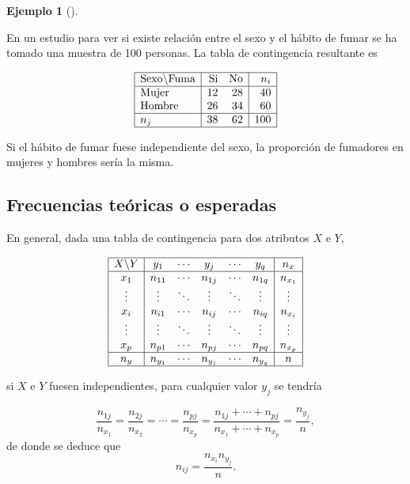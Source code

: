 \documentclass[
  a4paper,
]{scrreport}
\theoremstyle{plain}
\theoremstyle{definition}
\theoremstyle{definition}
\newtheorem{example}{Ejemplo}[chapter]
\theoremstyle{remark}
\begin{document}
\begin{example}[]\protect\hypertarget{exm-tabla-contingencia}{}\label{exm-tabla-contingencia}

En un estudio para ver si existe relación entre el sexo y el hábito de
fumar se ha tomado una muestra de 100 personas. La tabla de contingencia
resultante es

\[
\begin{array}{|l|rr|r|}
\hline
\mbox{Sexo}\backslash\mbox{Fuma} & \mbox{Si} & \mbox{No} & n_i\\
\hline
\mbox{Mujer} & 12 & 28 & 40 \\
\mbox{Hombre} & 26 & 34 & 60 \\
\hline
n_j & 38 & 62 & 100\\
\hline
\end{array}
\]

Si el hábito de fumar fuese independiente del sexo, la proporción de
fumadores en mujeres y hombres sería la misma.

\end{example}

\subsection{Frecuencias teóricas o
esperadas}\label{frecuencias-teuxf3ricas-o-esperadas}

En general, dada una tabla de contingencia para dos atributos \(X\) e
\(Y\),

\[
\begin{array}{|c|ccccc|c|}
\hline
X\backslash Y & y_1 & \cdots & y_j & \cdots & y_q & n_x\\
\hline
x_1 & n_{11} & \cdots & n_{1j} & \cdots & n_{1q} & n_{x_1}\\
\vdots & \vdots & \ddots & \vdots & \ddots & \vdots & \vdots \\
x_i & n_{i1} & \cdots & n_{ij} & \cdots & n_{iq} & n_{x_i}\\
\vdots & \vdots & \ddots & \vdots & \ddots & \vdots & \vdots\\
x_p & n_{p1} & \cdots & n_{pj} & \cdots & n_{pq} & n_{x_p} \\
\hline
n_y & n_{y_1} & \cdots & n_{y_j} & \cdots & n_{y_q} & n\\
\hline
\end{array}
\]

si \(X\) e \(Y\) fuesen independientes, para cualquier valor \(y_j\) se
tendría

\[
\frac{n_{1j}}{n_{x_1}} = \frac{n_{2j}}{n_{x_2}} = \cdots = \frac{n_{pj}}{n_{x_p}} = \frac{n_{1j}+\cdots
+n_{pj}}{n_{x_1}+\cdots+n_{x_p}} = \frac{n_{y_j}}{n},\] de donde se
deduce que \[n_{ij} = \frac{n_{x_i}n_{y_j}}{n}.
\]
\end{document}
